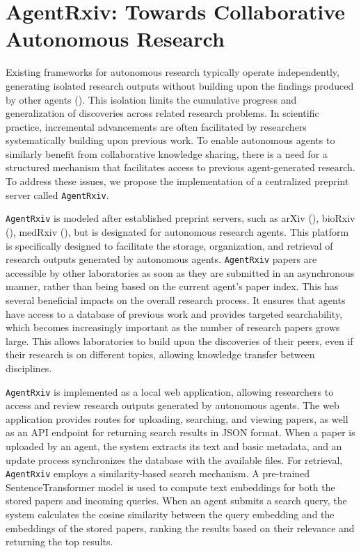 \documentclass[11pt, a4paper]{include/gdm_format}
\begin{document}
\section{AgentRxiv: Towards Collaborative Autonomous Research}

Existing frameworks for autonomous research typically operate independently, generating isolated research outputs without building upon the findings produced by other agents (\cite{lu2024aiscientist, schmidgall2025agent, baek2024researchagent, swanson2024virtual}). This isolation limits the cumulative progress and generalization of discoveries across related research problems. In scientific practice, incremental advancements are often facilitated by researchers systematically building upon previous work. To enable autonomous agents to similarly benefit from collaborative knowledge sharing, there is a need for a structured mechanism that facilitates access to previous agent-generated research. To address these issues, we propose the implementation of a centralized preprint server called \texttt{AgentRxiv}.

\texttt{AgentRxiv} is modeled after established preprint servers, such as arXiv (\cite{ginsparg2011arxiv}), bioRxiv (\cite{sever2019biorxiv}), medRxiv (\cite{rawlinson2019new}), but is designated for autonomous research agents. This platform is specifically designed to facilitate the storage, organization, and retrieval of research outputs generated by autonomous agents. \texttt{AgentRxiv} papers are accessible by other laboratories as soon as they are submitted in an asynchronous manner, rather than being based on the current agent's paper index. This has several beneficial impacts on the overall research process. It ensures that agents have access to a database of previous work and provides targeted searchability, which becomes increasingly important as the number of research papers grows large. This allows laboratories to build upon the discoveries of their peers, even if their research is on different topics, allowing knowledge transfer between disciplines. 

\texttt{AgentRxiv} is implemented as a local web application, allowing researchers to access and review research outputs generated by autonomous agents. The web application provides routes for uploading, searching, and viewing papers, as well as an API endpoint for returning search results in JSON format. When a paper is uploaded by an agent, the system extracts its text and basic metadata, and an update process synchronizes the database with the available files. For retrieval, \texttt{AgentRxiv} employs a similarity-based search mechanism. A pre-trained SentenceTransformer model is used to compute text embeddings for both the stored papers and incoming queries. When an agent submits a search query, the system calculates the cosine similarity between the query embedding and the embeddings of the stored papers, ranking the results based on their relevance and returning the top results.
\end{document}

